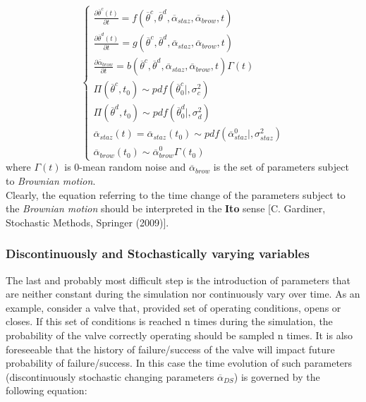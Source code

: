 \begin{equation}
\label{eq:systemThetaContAndDescreteStazAndBrow}
\left\{\begin{matrix}
\frac{\partial  \overline{\theta}^{c}\left ( t \right )}{\partial t}=f\left ( \overline{\theta}^{c},\overline{\theta}^{d}, \overline{\alpha}_{staz} ,\overline{\alpha}_{brow},      t \right ) \\
\frac{\partial  \overline{\theta}^{d}\left ( t \right )}{\partial t}=g\left ( \overline{\theta}^{c},\overline{\theta}^{d},\overline{\alpha}_{staz},\overline{\alpha}_{brow},t \right )\\
\frac{\partial \overline{\alpha}_{brow} }{\partial t}=b\left ( \overline{\theta}^{c},\overline{\theta}^{d},\overline{\alpha}_{staz},\overline{\alpha}_{brow},t \right )\Gamma \left ( t \right )
\\
\Pi \left ( \overline{\theta}^{c},t_{0} \right ) \sim pdf\left ( \overline{\theta}^{c}_{0}|,\sigma_{c}^{2} \right )\\
\Pi \left ( \overline{\theta}^{d},t_{0} \right ) \sim pdf\left ( \overline{\theta}^{d}_{0}|,\sigma_{d}^{2} \right ) \\
\overline{\alpha}_{staz}\left ( t \right )=\overline{\alpha}_{staz}\left ( t_{0} \right ) \sim pdf\left ( \overline{\alpha}_{staz}^{0}|, \sigma_{staz}^{2} \right ) \\
\overline{\alpha}_{brow}\left ( t_{0} \right ) \sim  \overline{\alpha}_{brow}^{0} \Gamma \left ( t_{0} \right )
\end{matrix}\right.
\end{equation}
where $\Gamma \left ( t \right )$ is 0-mean random noise and $\overline{\alpha}_{brow}$ is the set of parameters subject to \textit{Brownian motion}.
\\Clearly, the equation referring to the time change of the parameters subject to the \textit{Brownian motion} should be interpreted in the \textbf{Ito} sense [C. Gardiner, Stochastic Methods, Springer (2009)].

\subsubsection{Discontinuously and Stochastically varying variables}
The last and probably most difficult step is the introduction of parameters that are neither constant during the simulation nor continuously vary over time. As an example, consider a valve that, provided set of operating conditions, opens or closes. If this set of conditions is reached n times during the simulation, the probability of the valve correctly operating should be sampled n times. It is also foreseeable that the history of failure/success of the valve will impact future probability of failure/success.  In this case the time evolution of such parameters (discontinuously stochastic changing parameters  $\overline{\alpha}_{DS}$) is governed by the following equation:


